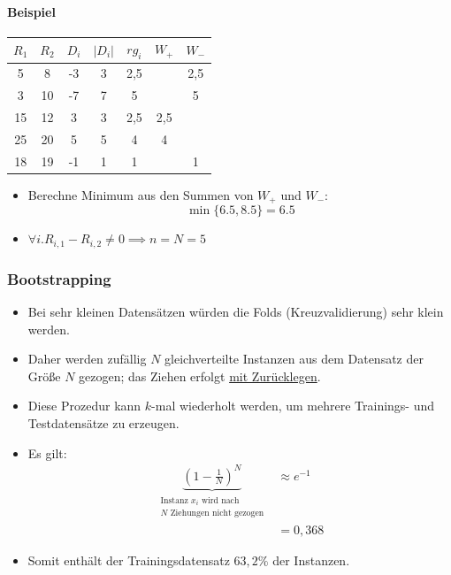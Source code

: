 \documentclass{scrartcl}
\begin{document}
\paragraph{Beispiel}

\begin{center}
	\begin{tabular}{|c|c|c|c|c|c|c|}
		\hline 
		$ R_1 $ & $ R_2 $ & $ D_i $ & $ |D_i| $ & $ rg_i $ & $ W_+ $ & $ W_- $ 
		\\ 
		\hline 
		5 & 8 & -3 & 3 & 2,5 &  & 2,5 \\ 
		\hline 
		3 & 10 & -7 & 7 & 5 &  & 5 \\ 
		\hline 
		15 & 12 & 3 & 3 & 2,5 & 2,5 &  \\ 
		\hline 
		25 & 20 & 5 & 5 & 4 & 4 &  \\ 
		\hline 
		18 & 19 & -1 & 1 & 1 &  & 1 \\ 
		\hline 
	\end{tabular} 
\end{center}

\begin{itemize}
	\item Berechne Minimum aus den Summen von $ W_+ $ und $ W_- $:
	\[ \min \{ 6.5,8.5 \} = 6.5 \]
	\item $ \forall i. R_{i,1} - R_{i,2} \neq 0 \implies n=N=5 $
\end{itemize}

\subsubsection{Bootstrapping}

\begin{itemize}
	\item Bei sehr kleinen Datensätzen würden die Folds (Kreuzvalidierung) sehr 
	klein werden.
	\item Daher werden zufällig $ N $ gleichverteilte Instanzen aus dem 
	Datensatz der Größe $ N $ gezogen; das Ziehen erfolgt \underline{mit 
	Zurücklegen}.
	\item Diese Prozedur kann $ k $-mal wiederholt werden, um mehrere 
	Trainings- und Testdatensätze zu erzeugen.
	\item Es gilt:
	\begin{align*}
		\underbrace{(1 - \frac{1}{N})^N}_{\substack{\text{Instanz } x_i \text{ 
		wird nach } \\ N \text{ Ziehungen nicht gezogen}}} &\approx e^{-1} \\
		&= 0,368
	\end{align*}
	\item Somit enthält der Trainingsdatensatz $ 63,2\% $ der Instanzen.
\end{itemize}
\end{document}
